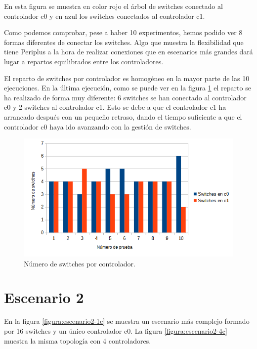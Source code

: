 \documentclass[a4paper, 12pt]{book}
\begin{document}
	En esta figura se muestra en color rojo el árbol de switches conectado al controlador c0 y en azul los switches conectados al controlador c1.
 	
 	Como podemos comprobar, pese a haber 10 experimentos, hemos podido ver 8 formas diferentes de conectar los switches. Algo que muestra la flexibilidad que tiene Periplus a la hora de realizar conexiones que en escenarios más grandes dará lugar a repartos equilibrados entre los controladores.
 	
 	El reparto de switches por controlador es homogéneo en la mayor parte de las 10 ejecuciones. En la última ejecución, como se puede ver en la figura \ref{figura:switchesporcontrollerescenario1} el reparto se ha realizado de forma muy diferente: 6 switches se han conectado al controlador c0 y 2 switches al controlador c1. Esto se debe a que el controlador c1 ha arrancado después con un pequeño retraso, dando el tiempo suficiente a que el controlador c0 haya ido avanzando con la gestión de switches. 
 	
 	\begin{figure}[H]
 		\centering
 		\includegraphics[width=16cm, keepaspectratio]{img/switchesporcontrollerescenario1}
 		\caption{Número de switches por controlador.}
 		\label{figura:switchesporcontrollerescenario1}
 	\end{figure}
 	
 	
 	
 	\clearpage
 	\section{Escenario 2}
 	
 	En la figura \ref{figura:escenario2-1c} se muestra un escenario más complejo formado por 16 switches y un único
 	controlador c0. La figura \ref{figura:escenario2-4c} muestra la misma topología con 4 controladores.
 		
\end{document}
